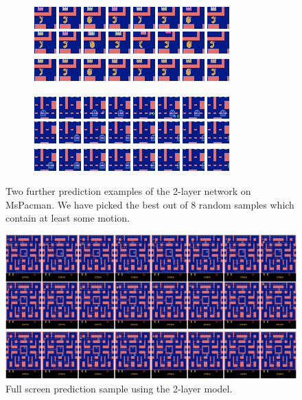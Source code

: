 \begin{figure}[h!tb]
\centering
\begin{subfigure}{0.49\textwidth}
  \centering
  \includegraphics[width=0.92\linewidth]{figures/pred/pac/random/pred-01.png}
  \caption{}
  \label{fig:pac-pred-random_extra1}
\end{subfigure}%
\begin{subfigure}{0.49\textwidth}
  \centering
  \includegraphics[width=0.92\linewidth]{figures/pred/pac/random/pred-02.png}
  \caption{}
  \label{fig:pac-pred-random_extra2}
\end{subfigure}
\caption[Prediction Samples on MsPacman]{Two further prediction examples of the 2-layer network on MsPacman. We have picked the best out of 8 random samples which contain at least some motion.} \label{fig:pac-pred-random_extra}
\end{figure}

\begin{figure}[htpb]
	\centering
	\includegraphics[width=1.0\linewidth]{figures/pred/pac/full/pred-01.png} 
	\caption[Full Screen Prediction Sample on MsPacman]{Full screen prediction sample using the 2-layer model.} \label{fig:pac-pred-full2}
\end{figure}

